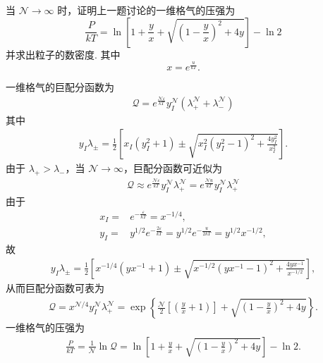 \documentclass{assignment}
\begin{document}
\begin{prob}
    当 $\mathcal{N}\rightarrow\infty$ 时，证明上一题讨论的一维格气的压强为
    \[
        \frac{P}{kT}=\ln\left[1+\frac{y}{x}+\sqrt{\left(1-\frac{y}{x}\right)^2+4y}\right]-\ln 2
    \]
    并求出粒子的数密度. 其中
    \[
        x=e^{\frac{u}{kT}}.
    \]
\end{prob}
\begin{pf}
    一维格气的巨配分函数为
    \begin{align}
        \mathcal{Q}=e^{\frac{\mathcal{N}\varepsilon}{kT}}y_I^{\mathcal{N}}(\lambda_+^{\mathcal{N}}+\lambda_-^{\mathcal{N}})
    \end{align}
    其中
    \begin{align}
        y_I\lambda_{\pm}=\frac{1}{2}\left[x_I(y_I^2+1)\pm\sqrt{x_I^2(y_I^2-1)^2+\frac{4y_I^2}{x_I^2}}\right].
    \end{align}
    由于 $\lambda_+>\lambda_-$，当 $\mathcal{N}\rightarrow\infty$，巨配分函数可近似为
    \begin{align}
        \mathcal{Q}\approx e^{\frac{\mathcal{N}\varepsilon}{kT}}y_I^{\mathcal{N}}\lambda_+^{\mathcal{N}}=e^{\frac{\mathcal{N}u}{kT}}y_I^{\mathcal{N}}\lambda_+^{\mathcal{N}}
    \end{align}
    由于
    \begin{align}
        x_I=&e^{-\frac{\varepsilon}{kT}}=x^{-1/4},\\
        y_I=&y^{1/2}e^{-\frac{2\varepsilon}{kT}}=y^{1/2}e^{-\frac{u}{2kT}}=y^{1/2}x^{-1/2},
    \end{align}
    故
    \begin{align}
        y_I\lambda_{\pm}=\frac{1}{2}\left[x^{-1/4}(yx^{-1}+1)\pm\sqrt{x^{-1/2}(yx^{-1}-1)^2+\frac{4yx^{-1}}{x^{-1/2}}}\right],
    \end{align}
    从而巨配分函数可表为
    \begin{align}
        \mathcal{Q}=x^{\mathcal{N}/4}y_I^{\mathcal{N}}\lambda_+^{\mathcal{N}}=\exp\left\{\frac{\mathcal{N}}{2}\left[\left(\frac{y}{x}+1\right)\right]+\sqrt{\left(1-\frac{y}{x}\right)^2+4y}\right\}.
    \end{align}
    一维格气的压强为
    \begin{align}
        \frac{P}{kT}=\frac{1}{\mathcal{N}}\ln\mathcal{Q}=\ln\left[1+\frac{y}{x}+\sqrt{\left(1-\frac{y}{x}\right)^2+4y}\right]-\ln 2.
    \end{align}

\end{pf}
\end{document}
